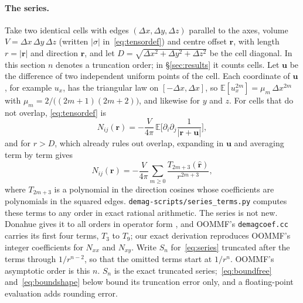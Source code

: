 \documentclass[11pt]{amsart}
\theoremstyle{plain}
\theoremstyle{definition}
\theoremstyle{remark}
\begin{document}
\paragraph{The series.}
Take two identical cells with edges $(\Delta x,\Delta y,\Delta z)$ parallel to the
axes, volume $V=\Delta x\,\Delta y\,\Delta z$ (written $|\sigma|$
in~\eqref{eq:tensordef}) and centre offset $\mathbf r$, with length $r=|\mathbf r|$
and direction $\hat{\mathbf r}$, and let $D=\sqrt{\Delta x^2+\Delta y^2+\Delta z^2}$ be the cell diagonal. In this
section $n$ denotes a truncation order; in \S\ref{sec:results} it counts cells.
Let $\mathbf u$ be the difference of two independent uniform points of
the cell. Each coordinate of $\mathbf u$, for example $u_x$, has the triangular law on
$[-\Delta x,\Delta x]$, so $\mathbb E[u_x^{2m}]=\mu_m\,\Delta x^{2m}$ with
$\mu_m=2/\big((2m+1)(2m+2)\big)$, and likewise for $y$ and $z$. For cells that do
not overlap, \eqref{eq:tensordef} is
\begin{equation}
  N_{ij}(\mathbf r) = -\frac{V}{4\pi}\,
  \mathbb E\Big[\partial_i\partial_j\frac{1}{|\mathbf r+\mathbf u|}\Big],
  \label{eq:repr}
\end{equation}
and for $r>D$, which already rules out overlap, expanding in $\mathbf u$ and
averaging term by term gives
\begin{equation}
  N_{ij}(\mathbf r) = -\frac{V}{4\pi}\sum_{m\ge 0}
  \frac{T_{2m+3}(\hat{\mathbf r})}{r^{2m+3}},
  \label{eq:series}
\end{equation}
where $T_{2m+3}$ is a polynomial in the direction cosines whose coefficients are
polynomials in the squared edges. \texttt{demag-scripts/series\_terms.py}
computes these terms to any order in exact rational arithmetic. The series is not
new. Donahue gives it to all orders in operator form \cite{Donahue2007}, and
OOMMF's \texttt{demagcoef.cc} carries its first four terms, $T_3$ to $T_9$; our
exact derivation reproduces OOMMF's integer coefficients for $N_{xx}$ and
$N_{xy}$. Write $S_n$ for~\eqref{eq:series} truncated after the terms through
$1/r^{n-2}$, so that the omitted terms start at $1/r^{n}$. OOMMF's asymptotic
order is this $n$. $S_n$ is the exact truncated series;~\eqref{eq:boundfree}
and~\eqref{eq:boundshape} below bound its truncation error only, and a
floating-point evaluation adds rounding error.
\end{document}
